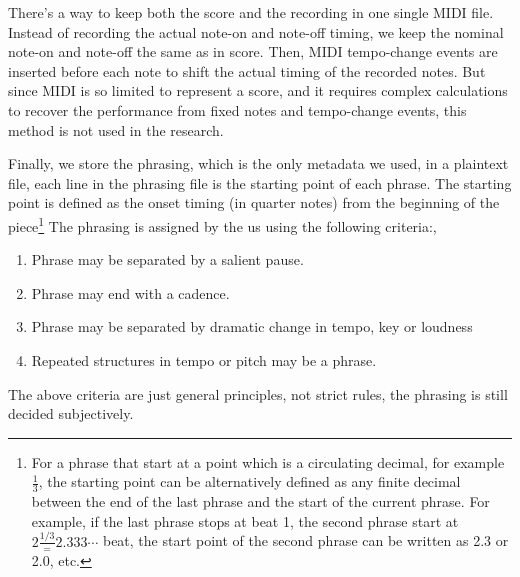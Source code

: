 There's a way to keep both the score and the recording in one single MIDI file. Instead of recording the actual note-on and note-off timing, we keep the nominal note-on and note-off the same as in score. Then, MIDI tempo-change events are inserted before each note to shift the actual timing of the recorded notes. But since MIDI is so limited to represent a score, and it requires complex calculations to recover the performance from fixed notes and tempo-change events, this method is not used in the research.


Finally, we store the phrasing, which is the only metadata we used, in a plaintext file, each line in the phrasing file is the starting point of each phrase. The starting point is defined as the onset timing (in quarter notes) from the beginning of the piece\footnote{For a phrase that start at a point which is a circulating decimal, for example $\frac{1}{3}$, the starting point can be alternatively defined as any finite decimal between the end of the last phrase and the start of the current phrase. For example, if the last phrase stops at beat 1, the second phrase start at $2\frac{1/3}=2.333\cdots$ beat, the start point of the second phrase can be written as 2.3 or 2.0, etc.} The phrasing is assigned by the us using the following criteria:, 
\begin{enumerate}
   \item Phrase may be separated by a salient pause.
   \item Phrase may end with a cadence.
   \item Phrase may be separated by dramatic change in tempo, key or loudness
   \item Repeated structures in tempo or pitch may be a phrase.
\end{enumerate}
The above criteria are just general principles, not strict rules, the phrasing is still decided subjectively.

